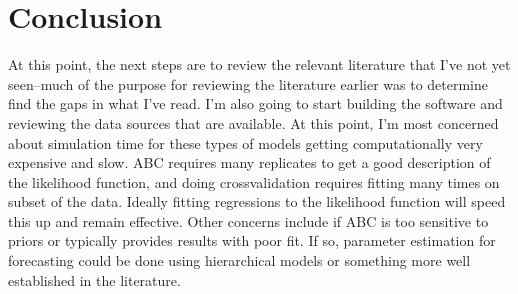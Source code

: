 \documentclass[]{article}
\begin{document}
\hypertarget{conclusion}{%
\section{Conclusion}\label{conclusion}}

At this point, the next steps are to review the relevant literature that I've not yet seen--much of the purpose for reviewing the literature earlier was to determine find the gaps in what I've read. I'm also going to start building the software and reviewing the data sources that are available. At this point, I'm most concerned about simulation time for these types of models getting computationally very expensive and slow. ABC requires many replicates to get a good description of the likelihood function, and doing crossvalidation requires fitting many times on subset of the data. Ideally fitting regressions to the likelihood function will speed this up and remain effective. Other concerns include if ABC is too sensitive to priors or typically provides results with poor fit. If so, parameter estimation for forecasting could be done using hierarchical models or something more well established in the literature.

%
%
%
\clearpage
{
\footnotesize

}
\end{document}
